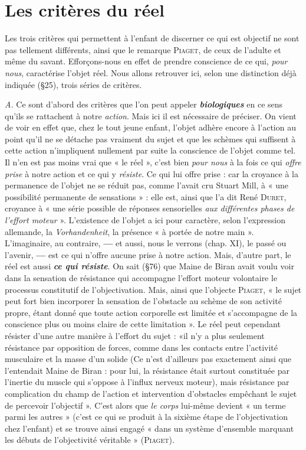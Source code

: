 \section{Les critères du réel}%
Les trois critères qui permettent
à l’enfant de discerner ce qui est objectif ne sont pas tellement
différents, ainsi que le remarque \textsc{Piaget}, de ceux de l'adulte
et même du savant. Efforçons-nous en effet de prendre conscience
de ce qui, {\it pour nous}, caractérise l’objet réel. Nous allons retrouver
ici, selon une distinction déjà indiquée (\S 25), trois séries de critères.

{\it A.} Ce sont d’abord des critères que l’on peut appeler \textbf{\textit {biologiques}}
en ce sens qu’ils se rattachent à notre {\it action}. Mais ici il est nécessaire
de préciser. On vient de voir en effet que, chez le tout jeune enfant,
l’objet adhère encore à l’action au point qu’il ne se détache pas
vraiment du sujet et que les schèmes qui suffisent à cette action
n’impliquent nullement par suite la conscience de l’objet comme tel.
Il n’en est pas moins vrai que « le réel », c’est bien {\it pour nous} à la fois
ce qui {\it offre prise} à notre action et ce qui y {\it résiste}. Ce qui lui offre
prise : car la croyance à la permanence de l’objet ne se réduit pas,
comme l'avait cru Stuart Mill, à « une possibilité permanente de sensations » :
elle est, ainsi que l’a dit René \textsc{Duret}, croyance à « une
série possible de réponses sensorielles {\it aux différentes phases de l'effort
moteur} ». L'existence de l’objet a ici pour caractère, selon l'expression
allemande, la {\it Vorhandenheit}, la présence « à portée de notre main ».
L'imaginaire, au contraire, {\bf —} et aussi, nous le verrons (chap. XI), le
passé ou l'avenir, {\bf —} est ce qui n’offre aucune prise à notre action.
Mais, d’autre part, le réel est aussi \textbf{\textit {ce qui résiste}}. On sait (\S 76) que
Maine de Biran avait voulu voir dans la sensation de résistance qui
accompagne l’effort moteur volontaire le processus constitutif de
l’objectivation. Mais, ainsi que l’objecte \textsc{Piaget}, « le sujet peut fort
bien incorporer la sensation de l’obstacle au schème de son activité
propre, étant donné que toute action corporelle est limitée et s’accompagne
de la conscience plus ou moins claire de cette limitation ». Le
réel peut cependant résister d’une autre manière à l'effort du sujet :
«il n’y a plus seulement résistance par opposition de forces, comme
dans les contacts entre l’activité musculaire et la masse d’un solide
{\scriptsize (Ce n’est d’ailleurs pas exactement ainsi que l’entendait Maine de Biran : pour lui,
la résistance était surtout constituée par l'inertie du muscle qui s'oppose à l'influx
nerveux moteur)},
mais résistance par complication du champ de l’action et intervention
d'obstacles empêchant le sujet de percevoir l'objectif ». C’est
alors que {\it le corps} lui-même devient « un terme parmi les autres »
(c'est ce qui se produit à la sixième étape de l’objectivation chez
l'enfant) et se trouve ainsi engagé « dans un système d’ensemble
marquant les débuts de l'objectivité véritable » (\textsc{Piaget}).

